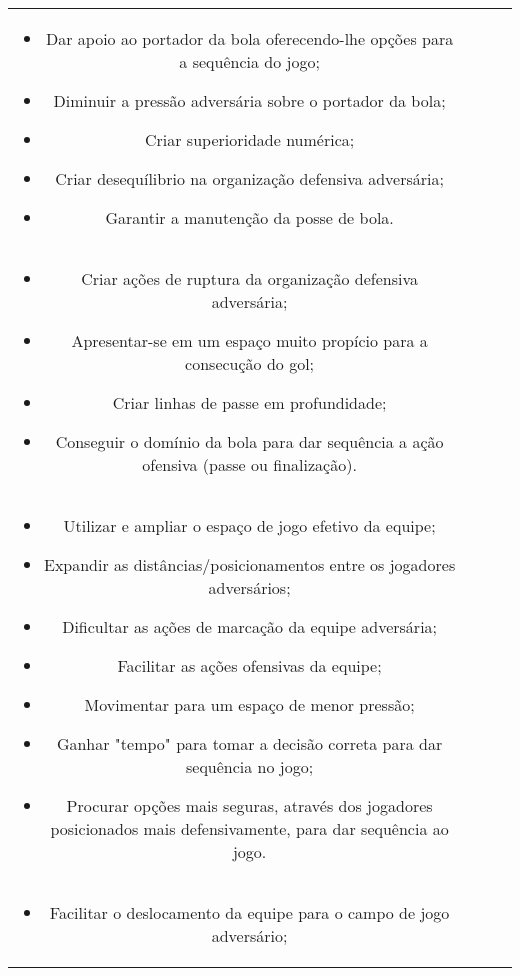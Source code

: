 \documentclass{article}
\begin{document}
\begin{table}
\begin{tabularx}{\linewidth}{@{}c L c L @{}}
\begin{tabular}[b]{@{}>{\centering\arraybackslash}p{\linewidth}@{}}
\begin{itemize}
			\end{itemize}   \\
			\midrule
			\thead{Cobertura Ofensiva}
			\begin{itemize} 
				\item Dar apoio ao portador da bola oferecendo-lhe opções para a sequência do jogo;
				\item Diminuir a pressão adversária sobre o portador da bola;
				\item Criar superioridade numérica;
				\item Criar desequílibrio na organização defensiva adversária;
				\item Garantir a manutenção da posse de bola.
			\end{itemize}   \\
			\midrule
			\thead{Mobilidade}
			\begin{itemize}
				\item Criar ações de ruptura da organização defensiva adversária;
				\item Apresentar-se em um espaço muito propício para a consecução do gol;
				\item Criar linhas de passe em profundidade;
				\item Conseguir o domínio da bola para dar sequência a ação ofensiva (passe ou finalização).
			\end{itemize}   \\
			\midrule
			\thead{Espaço}
			\begin{itemize}
				\item Utilizar e ampliar o espaço de jogo efetivo da equipe;
				\item Expandir as distâncias/posicionamentos entre os jogadores adversários;
				\item Dificultar as ações de marcação da equipe adversária;
				\item Facilitar as ações ofensivas da equipe;
				\item Movimentar para um espaço de menor pressão;
				\item Ganhar "tempo" para tomar a decisão correta para dar sequência no jogo;
				\item Procurar opções mais seguras, através dos jogadores posicionados mais defensivamente, para dar sequência ao jogo.
			\end{itemize}   \\
			\midrule
			\thead{Unidade Ofensiva}
			\begin{itemize}
				\item Facilitar o deslocamento da equipe para o campo de jogo adversário;

\end{itemize}
\end{tabular}
\end{tabularx}
\end{table}
\end{document}
